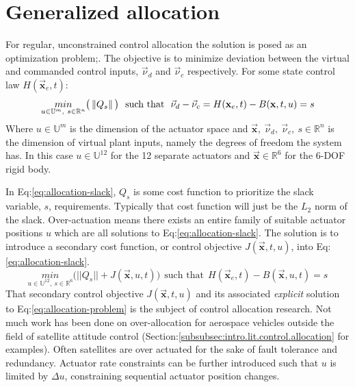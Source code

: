 \section{Generalized allocation}
\label{sec:allocation.slack}
For regular, unconstrained control allocation the solution is posed as an optimization problem;\cite{allocation,controlallocation}. The objective is to minimize deviation between the virtual and commanded control inputs, $\vec{\nu}_d$ and $\vec{\nu}_c$ respectively. For some state control law $H(\vec{\mathbf{x}}_e,t)$:
\begin{equation}\label{eq:allocation-slack}
\underset{u\in\mathbb{U}^{m},~s\in\mathbb{R}^{n}}{min}\big(\left\lVert Q_s\right\rVert\big)~~\text{such that}~~\vec{\nu}_d-\vec{\nu}_c=H(\mathbf{x}_e,t)-B(\mathbf{x},t,u)=s
\end{equation}
Where $u\in\mathbb{U}^m$ is the dimension of the actuator space and $\vec{\mathbf{x}},~\vec{\nu}_d,~\vec{\nu}_c,~s\in\mathbb{R}^{n}$ is the dimension of virtual plant inputs, namely the degrees of freedom the system has. In this case $u\in\mathbb{U}^{12}$ for the 12 separate actuators and $\vec{\mathbf{x}}\in\mathbb{R}^6$ for the 6-DOF rigid body.
\par
In Eq:\ref{eq:allocation-slack}, $Q_s$ is some cost function to prioritize the slack variable, $s$, requirements. Typically that cost function will just be the $L_2$ norm of the slack. Over-actuation means there exists an entire family of suitable actuator positions $u$ which are all solutions to Eq:\ref{eq:allocation-slack}. The solution is to introduce a secondary cost function, or control objective  $J(\vec{\mathbf{x}},t,u)$, into Eq:\ref{eq:allocation-slack}.
\begin{equation}\label{eq:allocation-problem}
\underset{u\in\mathbb{U}^{12},~s\in\mathbb{R}^{6}}{min}\big(||Q_s||+J(\vec{\mathbf{x}},u,t)\big)~~\text{such that}~~H(\vec{\mathbf{x}}_e,t)-B(\vec{\mathbf{x}},u,t)=s
\end{equation}
That secondary control objective $J(\vec{\mathbf{x}},t,u)$ and its associated \emph{explicit} solution to Eq:\ref{eq:allocation-problem} is the subject of control allocation research. Not much work has been done on over-allocation for aerospace vehicles outside the field of satellite attitude control (Section:\ref{subsubsec:intro.lit.control.allocation} for examples). Often satellites are over actuated for the sake of fault tolerance and redundancy\cite{FTCallocation,discreteFTC}. Actuator rate constraints can be further introduced such that $u$ is limited by $\Delta u$, constraining sequential actuator position changes.
